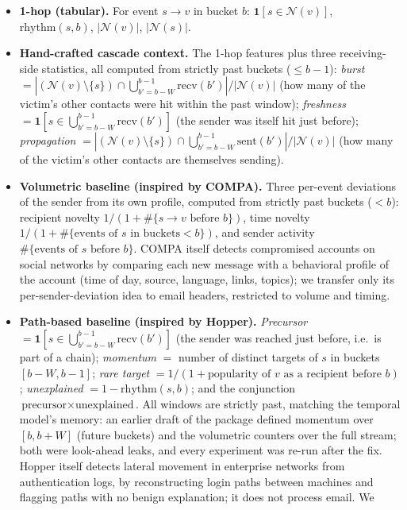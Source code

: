 \documentclass[a4paper,11pt]{article}
\begin{document}
\begin{itemize}
  \item \textbf{1-hop (tabular).} For event $s\!\to\!v$ in bucket $b$: $\mathbf{1}[s\in\mathcal{N}(v)]$,
  $\mathrm{rhythm}(s,b)$, $|\mathcal{N}(v)|$, $|\mathcal{N}(s)|$.
  \item \textbf{Hand-crafted cascade context.} The 1-hop features plus three receiving-side statistics,
  all computed from strictly past buckets ($\le b-1$):
  \emph{burst} $=|(\mathcal{N}(v)\setminus\{s\})\cap\bigcup_{b'=b-W}^{b-1}\mathrm{recv}(b')|/|\mathcal{N}(v)|$
  (how many of the victim's other contacts were hit within the past window); \emph{freshness}
  $=\mathbf{1}[s\in\bigcup_{b'=b-W}^{b-1}\mathrm{recv}(b')]$ (the sender was itself hit just before);
  \emph{propagation} $=|(\mathcal{N}(v)\setminus\{s\})\cap\bigcup_{b'=b-W}^{b-1}\mathrm{sent}(b')|/|\mathcal{N}(v)|$
  (how many of the victim's other contacts are themselves sending).
  \item \textbf{Volumetric baseline (inspired by COMPA).} Three per-event deviations of the sender from its own
  profile, computed from strictly past buckets ($<b$): recipient novelty $1/(1+\#\{s\!\to\!v \text{ before } b\})$, time novelty
  $1/(1+\#\{\text{events of } s \text{ in buckets} < b\})$, and sender activity $\#\{\text{events of } s \text{ before } b\}$. COMPA
  itself detects compromised accounts on social networks by comparing each new message with a behavioral
  profile of the account (time of day, source, language, links, topics); we transfer only its
  per-sender-deviation idea to email headers, restricted to volume and timing.
  \item \textbf{Path-based baseline (inspired by Hopper).} \emph{Precursor} $=\mathbf{1}[s\in\bigcup_{b'=b-W}^{b-1}\mathrm{recv}(b')]$
  (the sender was reached just before, i.e.\ is part of a chain); \emph{momentum} $=$ number of distinct
  targets of $s$ in buckets $[b-W,b-1]$; \emph{rare target} $=1/(1+\text{popularity of } v \text{ as a recipient before } b)$;
  \emph{unexplained} $=1-\mathrm{rhythm}(s,b)$; and the conjunction $\text{precursor}\times\text{unexplained}$.
  All windows are strictly past, matching the temporal model's memory: an earlier draft of the package
  defined momentum over $[b,b+W]$ (future buckets) and the volumetric counters over the full stream; both
  were look-ahead leaks, and every experiment was re-run after the fix.
  Hopper itself detects lateral movement in enterprise networks from authentication logs, by reconstructing
  login paths between machines and flagging paths with no benign explanation; it does not process email. We

\end{itemize}
\end{document}
